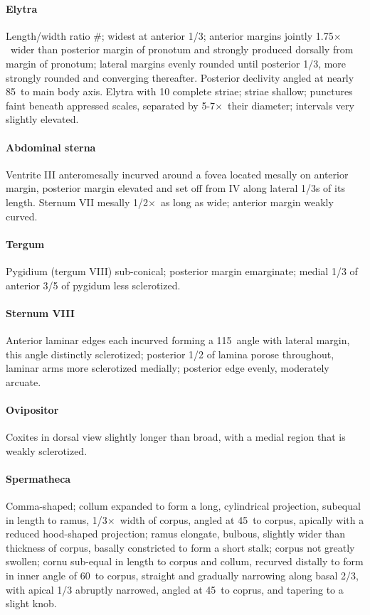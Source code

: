 \documentclass[fleqn,10pt,lineno]{wlpeerj} %
\newcommand{\td}{\textdegree~}
\newcommand{\x}{$\times$~}
\begin{document}
			\paragraph{Elytra}
				Length/width ratio \#; widest at anterior 1/3; anterior margins jointly 1.75\x wider than posterior margin of pronotum and strongly produced dorsally from margin of pronotum; lateral margins evenly rounded until posterior 1/3, more strongly rounded and converging thereafter. 
				Posterior declivity angled at nearly 85\td to main body axis. Elytra with 10 complete striae; striae shallow; punctures faint beneath appressed scales, separated by 5-7\x their diameter; intervals very slightly elevated.
			\paragraph{Abdominal sterna}
				Ventrite III anteromesally incurved around a fovea located mesally on anterior margin, posterior margin elevated and set off from IV along lateral 1/3s of its length. 
				Sternum VII mesally 1/2\x as long as wide; anterior margin weakly curved.
			\paragraph{Tergum}
				Pygidium (tergum VIII) sub-conical; posterior margin emarginate; medial 1/3 of anterior 3/5 of pygidum less sclerotized.		
			\paragraph{Sternum VIII}
				Anterior laminar edges each incurved forming a 115\td angle with lateral margin, this angle distinctly sclerotized; posterior 1/2 of lamina porose throughout, laminar arms more sclerotized medially; posterior edge evenly, moderately arcuate.
			\paragraph{Ovipositor}
				Coxites in dorsal view slightly longer than broad, with a medial region that is weakly sclerotized.
			\paragraph{Spermatheca}
				Comma-shaped; collum expanded to form a long, cylindrical projection, subequal in length to ramus, 1/3\x width of corpus, angled at 45\td to corpus, apically with a reduced hood-shaped projection; ramus elongate, bulbous, slightly wider than thickness of corpus, basally constricted to form a short stalk; corpus not greatly swollen; cornu sub-equal in length to corpus and collum, recurved distally to form in inner angle of 60\td to corpus, straight and gradually narrowing along basal 2/3, with apical 1/3 abruptly narrowed, angled at 45\td to coprus, and tapering to a slight knob.
\end{document}
